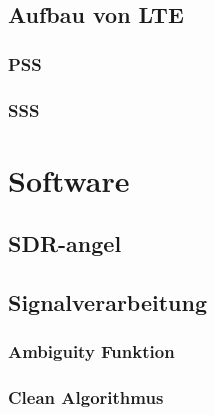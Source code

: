 \subsection{Aufbau von LTE}
\subsubsection{PSS}
\subsubsection{SSS}
\section{Software}
\subsection{SDR-angel}
\subsection{Signalverarbeitung}
\subsubsection{Ambiguity Funktion}
\subsubsection{Clean Algorithmus}

